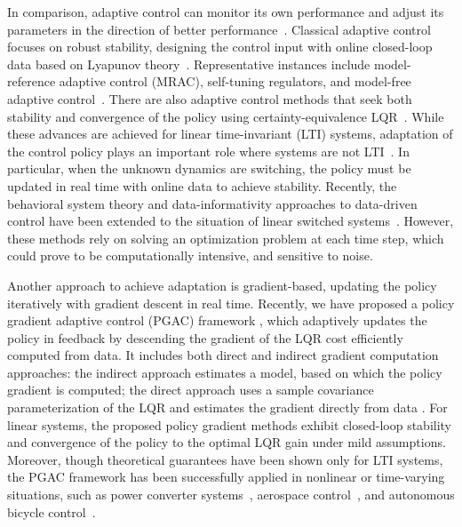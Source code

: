 \documentclass[letterpaper, 10 pt, conference]{ieeeconf}  %
\begin{document}
In comparison, adaptive control can monitor its own performance and adjust its parameters in the direction of better performance~\cite{drenick1957adaptive, anderson2005failures}. Classical adaptive control focuses on robust stability, designing the control input with online closed-loop data based on Lyapunov theory~\cite{ioannou1996robust}. Representative instances include model-reference adaptive control (MRAC), self-tuning regulators, and model-free adaptive control~\cite{ioannou1996robust,8621060}. There are also adaptive control methods that seek both stability and convergence of the policy using certainty-equivalence LQR~\cite{mania_certainty_2019,lu2023almost,simchowitz2020naive,cohen2019learning}. While these advances are achieved for linear time-invariant (LTI) systems, adaptation of the control policy plays an important role where systems are not LTI~\cite{dai2025online, teutsch2023online, wang2024data}. In particular, when the unknown dynamics are switching, the policy must be updated in real time with online data to achieve stability. Recently, the behavioral system theory and data-informativity approaches to data-driven control have been extended to the situation of linear switched systems~\cite{rotulo2022online, liu2023online,bianchi2025data}. However, these methods rely on solving an optimization problem at each time step, which could prove to be computationally intensive, and sensitive to noise. 
 

Another approach to achieve adaptation is gradient-based, updating the policy iteratively with gradient descent in real time. Recently, we have proposed a policy gradient adaptive control (PGAC) framework \cite{zhao2025policy}, which adaptively updates the policy in feedback by descending the gradient of the LQR cost efficiently computed from data. It includes both direct and indirect gradient computation approaches: the indirect approach estimates a model, based on which the policy gradient is computed; the direct approach uses a sample covariance parameterization of the LQR and estimates the gradient directly from data \cite{zhao2024data}. For linear systems, the proposed policy gradient methods exhibit closed-loop stability and convergence of the policy to the optimal LQR gain under mild assumptions. Moreover, though theoretical guarantees have been shown only for LTI systems, the PGAC framework has been successfully applied in nonlinear or time-varying situations, such as power converter systems~\cite{11187193}, aerospace control~\cite{10981973}, and autonomous bicycle control~\cite{persson2025adaptive}. 
\end{document}
